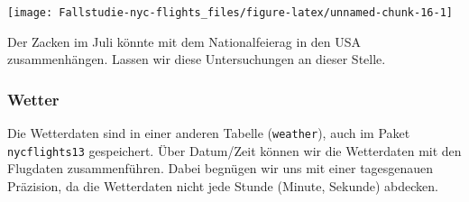 \documentclass[]{article}
\begin{document}
\begin{center}\texttt{[image: Fallstudie-nyc-flights\_files/figure-latex/unnamed-chunk-16-1]} \end{center}

Der Zacken im Juli könnte mit dem Nationalfeierag in den USA
zusammenhängen. Lassen wir diese Untersuchungen an dieser Stelle.

\hypertarget{wetter}{%
\subsubsection{Wetter}\label{wetter}}

Die Wetterdaten sind in einer anderen Tabelle (\texttt{weather}), auch
im Paket \texttt{nycflights13} gespeichert. Über Datum/Zeit können wir
die Wetterdaten mit den Flugdaten zusammenführen. Dabei begnügen wir uns
mit einer tagesgenauen Präzision, da die Wetterdaten nicht jede Stunde
(Minute, Sekunde) abdecken.
\end{document}
